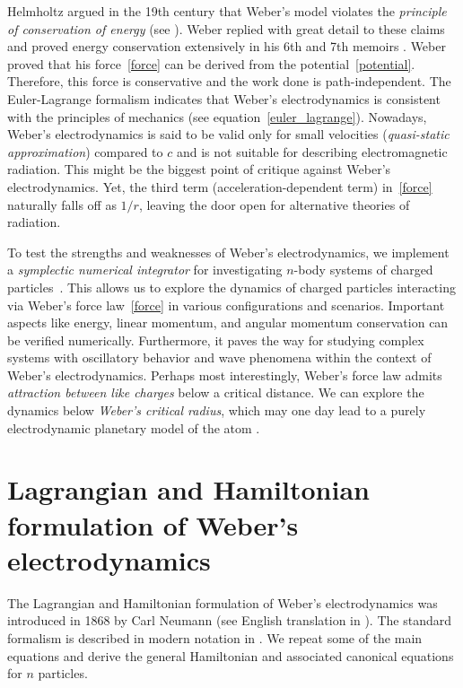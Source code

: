 \documentclass[12pt,a4paper]{article}
\theoremstyle{definition}
\theoremstyle{remark}
\begin{document}
Helmholtz argued in the 19th century that Weber's model violates the \textit{principle of conservation of energy} (see \citep{assis-weber-vol4}). Weber replied with great detail to these claims and proved energy conservation extensively in his 6th and 7th memoirs \citep{assis-weber-vol4}. Weber proved that his force~\eqref{force} can be derived from the potential~\eqref{potential}. Therefore, this force is conservative and the work done is path-independent. The Euler-Lagrange formalism indicates that Weber's electrodynamics is consistent with the principles of mechanics (see equation~\eqref{euler_lagrange}). Nowadays, Weber's electrodynamics is said to be valid only for small velocities (\textit{quasi-static approximation}) compared to $c$ and is not suitable for describing electromagnetic radiation. This might be the biggest point of critique against Weber's electrodynamics. Yet, the third term (acceleration-dependent term) in~\eqref{force} naturally falls off as $1/r$, leaving the door open for alternative theories of radiation.

To test the strengths and weaknesses of Weber's electrodynamics, we implement a \textit{symplectic numerical integrator} for investigating $n$-body systems of charged particles~\citep{WeberElectrodynamics.jl}. This allows us to explore the dynamics of charged particles interacting via Weber's force law~\eqref{force} in various configurations and scenarios. Important aspects like energy, linear momentum, and angular momentum conservation can be verified numerically. Furthermore, it paves the way for studying complex systems with oscillatory behavior and wave phenomena within the context of Weber's electrodynamics. Perhaps most interestingly, Weber's force law admits \textit{attraction between like charges} below a critical distance. We can explore the dynamics below \textit{Weber's critical radius}, which may one day lead to a purely electrodynamic planetary model of the atom \citep{assis-planetary-model}.

\section{Lagrangian and Hamiltonian formulation of Weber's electrodynamics}\label{LH}
The Lagrangian and Hamiltonian formulation of Weber's electrodynamics was introduced in 1868 by Carl Neumann (see English translation in \citep{assis-weber-vol4}). The standard formalism is described in modern notation in \citep{assis-weber}. We repeat some of the main equations and derive the general Hamiltonian and associated canonical equations for $n$ particles.
\end{document}
